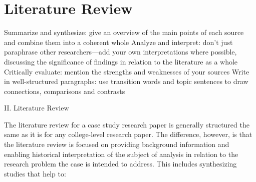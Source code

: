 
\chapter{Literature Review} %

\label{Chapter2} %

Summarize and synthesize: give an overview of the main points of each source and combine them into a coherent whole
Analyze and interpret: don’t just paraphrase other researchers—add your own interpretations where possible, discussing the significance of findings in relation to the literature as a whole
Critically evaluate: mention the strengths and weaknesses of your sources
Write in well-structured paragraphs: use transition words and topic sentences to draw connections, comparisons and contrasts

II.  Literature Review

The literature review for a case study research paper is generally structured the same as it is for any college-level research paper. The difference, however, is that the literature review is focused on providing background information and enabling historical interpretation of the subject of analysis in relation to the research problem the case is intended to address. This includes synthesizing studies that help to:

